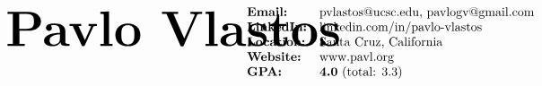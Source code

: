 \documentclass[paper=a4,fontsize=11pt]{article} %
\def \mainColWidth {0.8\textwidth}		%
\begin{document}
	\setlength{\abovedisplayskip}{0pt}
	\setlength{\belowdisplayskip}{0pt}
	\setlength{\abovedisplayshortskip}{0pt}
	\setlength{\belowdisplayshortskip}{0pt}
\begin{align*}
	&
	\begin{array}{ll}
	\parbox[t]{0.55\textwidth}{%
		\text{\fontsize{40}{48}\selectfont \ \textbf{Pavlo Vlastos}}\\
	}%
	&
	\parbox{\mainColWidth}{%
		$\begin{array}[t]{ll}
		\textbf{Email:} & \text{pvlastos@ucsc.edu, pavlogv@gmail.com}\\
		\textbf{LinkedIn:} & \text{linkedin.com/in/pavlo-vlastos}\\
		\textbf{Location:} & \text{Santa Cruz, California}\\
		\textbf{Website:} & \text{www.pavl.org}\\
		\textbf{GPA:} & \textbf{4.0} \ \text{(total: 3.3)}
		\end{array}$
	}%
	\end{array}
\end{align*}
\end{document}
